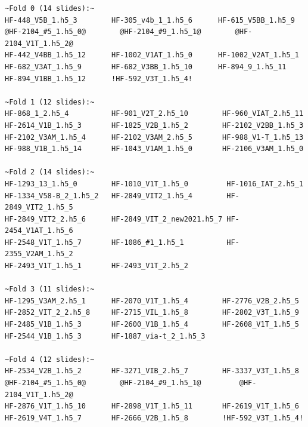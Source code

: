 

\newpage

\begin{lstlisting}[label=lst:test-list, caption=Test assignments.]
~Fold 0 (14 slides):~
HF-448_V5B_1.h5_3        HF-305_v4b_1_1.h5_6      HF-615_V5BB_1.h5_9
@HF-2104_#5_1.h5_0@        @HF-2104_#9_1.h5_1@        @HF-2104_V1T_1.h5_2@
HF-442_V4BB_1.h5_12      HF-1002_V1AT_1.h5_0      HF-1002_V2AT_1.h5_1
HF-682_V3AT_1.h5_9       HF-682_V3BB_1.h5_10      HF-894_9_1.h5_11
HF-894_V1BB_1.h5_12      !HF-592_V3T_1.h5_4!

~Fold 1 (12 slides):~
HF-868_1_2.h5_4          HF-901_V2T_2.h5_10        HF-960_VIAT_2.h5_11
HF-2614_V1B_1.h5_3       HF-1825_V2B_1.h5_2        HF-2102_V2BB_1.h5_3
HF-2102_V3AM_1.h5_4      HF-2102_V3AM_2.h5_5       HF-988_V1-T_1.h5_13
HF-988_V1B_1.h5_14       HF-1043_V1AM_1.h5_0       HF-2106_V3AM_1.h5_0

~Fold 2 (14 slides):~
HF-1293_13_1.h5_0        HF-1010_V1T_1.h5_0         HF-1016_IAT_2.h5_1
HF-1334_V58-B_2_1.h5_2   HF-2849_VIT2_1.h5_4        HF-2849_VIT2_1.h5_5
HF-2849_VIT2_2.h5_6      HF-2849_VIT_2_new2021.h5_7 HF-2454_V1AT_1.h5_6
HF-2548_V1T_1.h5_7       HF-1086_#1_1.h5_1          HF-2355_V2AM_1.h5_2
HF-2493_V1T_1.h5_1       HF-2493_V1T_2.h5_2

~Fold 3 (11 slides):~
HF-1295_V3AM_2.h5_1      HF-2070_V1T_1.h5_4        HF-2776_V2B_2.h5_5
HF-2852_VIT_2_2.h5_8     HF-2715_VIL_1.h5_8        HF-2802_V3T_1.h5_9
HF-2485_V1B_1.h5_3       HF-2600_V1B_1.h5_4        HF-2608_V1T_1.h5_5
HF-2544_V1B_1.h5_3       HF-1887_via-t_2_1.h5_3

~Fold 4 (12 slides):~
HF-2534_V2B_1.h5_2       HF-3271_VIB_2.h5_7        HF-3337_V3T_1.h5_8
@HF-2104_#5_1.h5_0@        @HF-2104_#9_1.h5_1@         @HF-2104_V1T_1.h5_2@
HF-2876_V1T_1.h5_10      HF-2898_V1T_1.h5_11       HF-2619_V1T_1.h5_6
HF-2619_V4T_1.h5_7       HF-2666_V2B_1.h5_8        !HF-592_V3T_1.h5_4!

\end{lstlisting}

